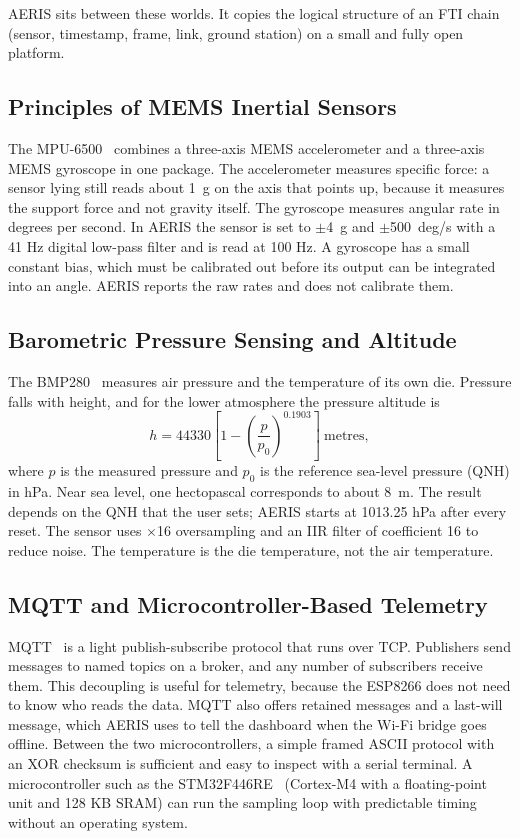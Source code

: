 \documentclass[12pt,a4paper]{report}
\begin{document}
AERIS sits between these worlds. It copies the logical structure of an FTI chain (sensor, timestamp, frame, link, ground station) on a small and fully open platform.

\subsection{Principles of MEMS Inertial Sensors}
The MPU-6500~\cite{mpu6500} combines a three-axis MEMS accelerometer and a three-axis MEMS gyroscope in one package. The accelerometer measures specific force: a sensor lying still reads about 1~g on the axis that points up, because it measures the support force and not gravity itself. The gyroscope measures angular rate in degrees per second. In AERIS the sensor is set to $\pm$4~g and $\pm$500~deg/s with a 41 Hz digital low-pass filter and is read at 100 Hz. A gyroscope has a small constant bias, which must be calibrated out before its output can be integrated into an angle. AERIS reports the raw rates and does not calibrate them.

\subsection{Barometric Pressure Sensing and Altitude}
The BMP280~\cite{bmp280} measures air pressure and the temperature of its own die. Pressure falls with height, and for the lower atmosphere the pressure altitude is
\[
h = 44330\left[1-\left(\frac{p}{p_0}\right)^{0.1903}\right]\ \mathrm{metres},
\]
where $p$ is the measured pressure and $p_0$ is the reference sea-level pressure (QNH) in hPa. Near sea level, one hectopascal corresponds to about 8~m. The result depends on the QNH that the user sets; AERIS starts at 1013.25 hPa after every reset. The sensor uses $\times$16 oversampling and an IIR filter of coefficient 16 to reduce noise. The temperature is the die temperature, not the air temperature.

\subsection{MQTT and Microcontroller-Based Telemetry}
MQTT~\cite{mqtt} is a light publish-subscribe protocol that runs over TCP. Publishers send messages to named topics on a broker, and any number of subscribers receive them. This decoupling is useful for telemetry, because the ESP8266 does not need to know who reads the data. MQTT also offers retained messages and a last-will message, which AERIS uses to tell the dashboard when the Wi-Fi bridge goes offline. Between the two microcontrollers, a simple framed ASCII protocol with an XOR checksum is sufficient and easy to inspect with a serial terminal. A microcontroller such as the STM32F446RE~\cite{stm32} (Cortex-M4 with a floating-point unit and 128 KB SRAM) can run the sampling loop with predictable timing without an operating system.
\end{document}
